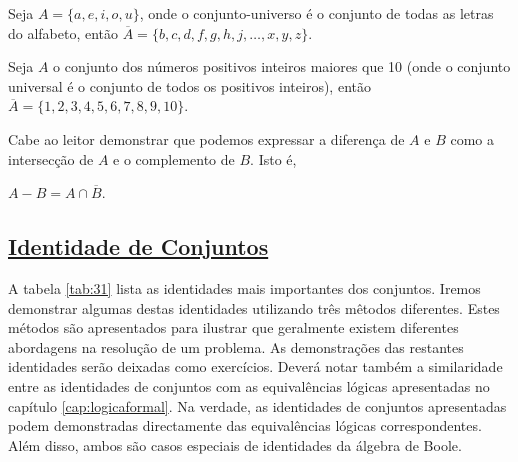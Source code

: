 \begin{exmp}
\label{exem323}
Seja $A = \{a,e,i,o,u\}$, onde o conjunto-universo é o conjunto de todas as
letras do alfabeto, então $\overline{A} = \{b,c,d,f,g,h,j,\ldots,x,y,z\}$.
\end{exmp}

\begin{exmp}
\label{exem324}
Seja $A$ o conjunto dos números positivos inteiros maiores que 10 (onde o
conjunto universal é o conjunto de todos os positivos inteiros), então
$\overline{A} = \{1,2,3,4,5,6,7,8,9,10\}$.
\end{exmp}

Cabe ao leitor demonstrar que podemos expressar a diferença de $A$ e $B$ como a
intersecção de $A$ e o complemento de $B$. Isto é,


{
$A-B=A \cap \overline{B}.$\\
}


\subsection*{\underline{Identidade de Conjuntos}}

A tabela \ref{tab:31} lista as identidades mais importantes dos conjuntos.
Iremos demonstrar algumas destas identidades utilizando três mêtodos diferentes.
Estes métodos são apresentados para ilustrar que geralmente existem diferentes
abordagens na resolução de um problema. As demonstrações das restantes
identidades serão deixadas como exercícios. Deverá notar também a similaridade
entre as identidades de conjuntos com as equivalências lógicas apresentadas no
capítulo \ref{cap:logicaformal}. Na verdade, as identidades de conjuntos
apresentadas podem demonstradas directamente das equivalências lógicas
correspondentes. Além disso, ambos são casos especiais de identidades da álgebra
de Boole.

